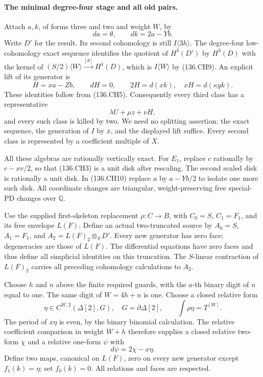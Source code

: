 \paragraph{The minimal degree-four stage and all old pairs.}
Attach $a,k$, of forms three and two and weight $W$, by
\[
                       da=\theta,\qquad dk=2a-Yb.
 \tag{136.CH10}
\]
Write $D'$ for the result.  Its second cohomology is still
$I\langle3h\rangle$.  The degree-four low-cohomology exact
sequence identifies the quotient of $H^3(D')$ by $H^3(D)$
with the kernel of
$(S/2)\langle W\rangle\xrightarrow{[\theta]}H^4(D)$,
which is $I\langle W\rangle$ by (136.CH9).
An explicit lift of its generator is
\[
 H=xa-Zb,\qquad dH=0,\qquad
                    2H=d(xk),\quad xH=d(\kappa yk).
 \tag{136.CH11}
\]
These identities follow from (136.CH5).  Consequently every
third class has a representative
\[
                        \lambda U+\mu z+\nu H,
 \tag{136.CH12}
\]
and every such class is killed by two.  We need no splitting
assertion: the exact sequence, the generation of $I$ by
$\bar x$, and the displayed lift suffice.  Every second
class is represented by a coefficient multiple of $X$.

All these algebras are rationally vertically exact.  For
$E_1$, replace $c$ rationally by $c-xv/2$, so that
(136.CH3) is a unit disk after rescaling.  The second
scaled disk is rationally a unit disk.  In (136.CH10)
replace $a$ by $a-Yb/2$ to isolate one more such disk.
All coordinate changes are triangular, weight-preserving
free special-PD changes over $\mathbb Q$.

Use the supplied first-skeleton replacement
$\rho:C\to B$, with $C_0=S$, $C_1=F_1$, and its free
envelope $L(F)$.  Define an actual two-truncated source
by $A_0=S$, $A_1=F_1$, and
$A_2=L(F)_2\otimes_S D'$.  Every new generator has zero
face; degeneracies are those of $L(F)$.  The differential
equations have zero faces and thus define all simplicial
identities on this truncation.  The $S$-linear contraction
of $L(F)_2$ carries all preceding cohomology calculations
to $A_2$.

Choose $h$ and $n$ above the finite required guards, with
the $a$-th binary digit of $n$ equal to one.  The same
digit of $W=4h+n$ is one.  Choose a closed relative form
\[
 \eta\in C^{W,2}(\Delta[2],G),\quad
 G=\partial\Delta[2],\qquad
                         \int\rho\eta=T^{[W]}.
 \tag{136.CH13}
\]
The period of $x\eta$ is even, by the binary binomial
calculation.  The relative coefficient comparison in
weight $W+h$ therefore supplies a closed relative two-form
$\chi$ and a relative one-form $\psi$ with
\[
                              d\psi=2\chi-x\eta.
 \tag{136.CH14}
\]
Define two maps, canonical on $L(F)$, zero on every new
generator except $f_1(k)=\eta$; set $f_0(k)=0$.
All relations and faces are respected.

